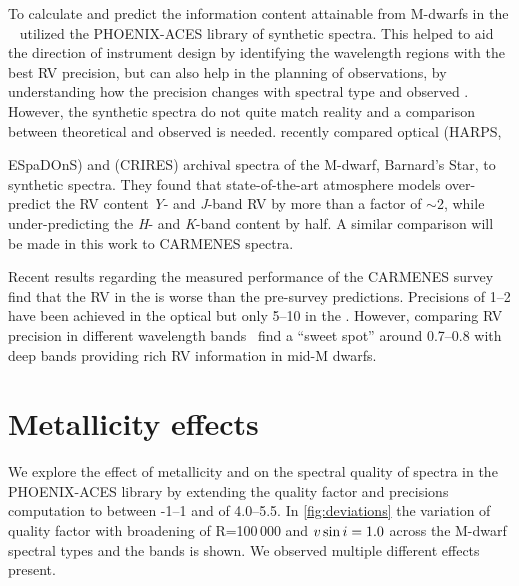 To calculate and predict the information content attainable from {M-dwarfs} in the \nir{}~\cite{figueira_radial_2016} utilized the {PHOENIX-ACES} library of synthetic spectra.
This helped to aid the direction of instrument design by identifying the wavelength regions with the best {RV} precision, but can also help in the planning of observations, by understanding how the precision changes with spectral type and observed {\snr{}}.
However, the synthetic spectra do not quite match reality and a comparison between theoretical and observed is needed.
\citet{artigau_optical_2018} recently compared optical (HARPS, {ESpaDOnS) and \nir{} (CRIRES) archival spectra of the M-dwarf, Barnard's Star, to synthetic spectra.
They found that state-of-the-art atmosphere models over-predict the {RV} content \emph{Y}- and \emph{J}-band {RV} by more than a factor of \(\sim\)2, while under-predicting the \emph{H}- and \emph{K}-band content by half.
A similar comparison will be made in this work to {CARMENES} spectra.

Recent results regarding the measured performance of the CARMENES survey~\citep{reiners_carmenes_2018,quirrenbach_carmenes_2018} find that the {RV} in the \nir{} is worse than the pre-survey predictions.
Precisions of 1--2\mps{} have been achieved in the optical but only 5--10\mps{} in the \nir{}.
However, comparing RV precision in different wavelength bands~\citet{quirrenbach_carmenes_2018} find a ``sweet spot'' around 0.7--0.8\um{} with deep  bands providing rich {RV} information in mid-M dwarfs.











\section{Metallicity \Logg{} effects}
We explore the effect of metallicity and \Logg{} on the spectral quality of spectra in the {PHOENIX-ACES} library by extending the quality factor and precisions computation to \feh{} between -1--1 and \Logg{} of 4.0--5.5.
In \cref{fig:deviations} the variation of quality factor with broadening of R=100\,000 and $v\sin{i}=1.0$\kmps{} across the {M-dwarf} spectral types and the \nir{} bands is shown.
We observed multiple different effects present.


}
